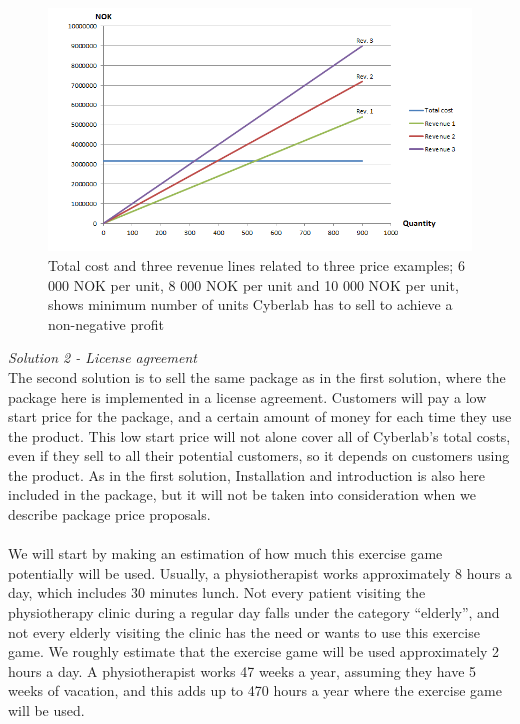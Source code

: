\begin{figure}
\label{fig:RevenueStreamQuantity}
\begin{center}
\includegraphics[scale=0.7]{revenuestreamquantity}
\caption[Quantity examples]{Total cost and three revenue lines related to three price examples; 6 000 NOK per unit, 8 000 NOK per unit and 10 000 NOK per unit, shows minimum number of units Cyberlab has to sell to achieve a non-negative profit}
\end{center}
\end{figure}
\emph{Solution 2 - License agreement}\\
The second solution is to sell the same package as in the first solution, where the package here is implemented in a license agreement. Customers will pay a low start price for the package, and a certain amount of money for each time they use the product. This low start price will not alone cover all of Cyberlab’s total costs, even if they sell to all their potential customers, so it depends on customers using the product. As in the first solution, Installation and introduction is also here included in the package, but it will not be taken into consideration when we describe package price proposals. \\ \\
We will start by making an estimation of how much this exercise game potentially will be used. Usually, a physiotherapist works approximately 8 hours a day, which includes 30 minutes lunch. Not every patient visiting the physiotherapy clinic during a regular day falls under the category “elderly”, and not every elderly visiting the clinic has the need or wants to use this exercise game. We roughly estimate that the exercise game will be used approximately 2 hours a day. A physiotherapist works 47 weeks a year, assuming they have 5 weeks of vacation, and this adds up to 470 hours a year where the exercise game will be used.\\ \\
